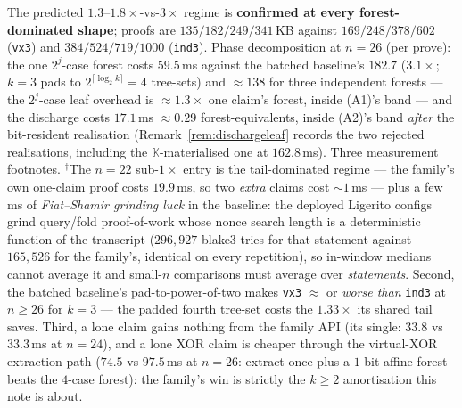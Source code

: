 \documentclass[11pt]{article}
\newcommand{\K}{\mathbb{K}}            %
\DeclareRobustCommand{\code}[1]{{\def\_{\textunderscore\allowbreak}\texttt{#1}}}
\theoremstyle{plain}
\theoremstyle{definition}
\theoremstyle{remark}
\begin{document}
\noindent The predicted $1.3$--$1.8\times$-vs-$3\times$ regime is
\textbf{confirmed at every forest-dominated shape}; proofs are
$135/182/249/341$\,KB against $169/248/378/602$ (\code{vx3}) and
$384/524/719/1000$ (\code{ind3}). Phase decomposition at $n=26$ (per
prove): the one $2^{j}$-case forest costs $59.5$\,ms against the batched
baseline's $182.7$ ($3.1\times$; $k=3$ pads to $2^{\lceil\log_2
k\rceil}=4$ tree-sets) and ${\approx}138$ for three independent forests
--- the $2^{j}$-case leaf overhead is ${\approx}1.3\times$ one claim's
forest, inside (A1)'s band --- and the discharge costs $17.1$\,ms
${\approx}0.29$ forest-equivalents, inside (A2)'s band \emph{after} the
bit-resident realisation (Remark~\ref{rem:dischargeleaf} records the two
rejected realisations, including the $\K$-materialised one at
$162.8$\,ms). Three measurement footnotes. $^{\dagger}$The $n=22$
sub-$1\times$ entry is the tail-dominated regime --- the family's own
one-claim proof costs $19.9$\,ms, so two \emph{extra} claims cost
${\sim}1$\,ms --- plus a few ms of \emph{Fiat--Shamir grinding luck} in
the baseline: the deployed Ligerito configs grind query/fold
proof-of-work whose nonce search length is a deterministic function of
the transcript ($296{,}927$ blake3 tries for that statement against
$165{,}526$ for the family's, identical on every repetition), so
in-window medians cannot average it and small-$n$ comparisons must
average over \emph{statements}. Second, the batched baseline's
pad-to-power-of-two makes \code{vx3} $\approx$ or \emph{worse than}
\code{ind3} at $n\ge26$ for $k=3$ --- the padded fourth tree-set costs
the $1.33\times$ its shared tail saves. Third, a lone claim gains
nothing from the family API (its single: $33.8$ vs $33.3$\,ms at
$n=24$), and a lone XOR claim is cheaper through the virtual-XOR
extraction path ($74.5$ vs $97.5$\,ms at $n=26$: extract-once plus a
$1$-bit-affine forest beats the $4$-case forest): the family's win is
strictly the $k\ge2$ amortisation this note is about.
\end{document}
